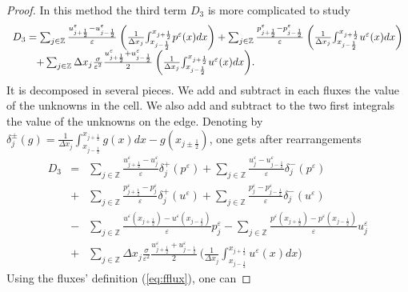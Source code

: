 \documentclass[a4paper,french,english,10pt]{article}
\newcommand\eps{\varepsilon}
\begin{document}
\begin{proof}
In this method the third term
 $D_3$ is more complicated to study
\begin{equation*}
\begin{array}{l}
 D_3 = \sum_{j\in \mathbb{Z}}
\frac{u_{j+\frac12 }^{\eps}-u_{j-\frac12 }^{\eps}}{\eps} \: \bigg(
\frac{1}{\Delta x_j} {\int_{x_{j-\frac12}}^{x_{j+\frac12}}}
 p^{\eps}(x) dx \bigg)
+\sum_{j\in \mathbb{Z}}
\frac{p_{j+\frac12 }^{\eps}-p_{j-\frac12 }^{\eps}}{\eps} \: \bigg(
\frac{1}{\Delta x_j} 
{\int_{x_{j-\frac12}}^{x_{j+\frac12}}}
 u^{\eps}(x) dx \bigg) \\
\hspace{0.8cm}+\sum_{j\in \mathbb{Z}} \Delta x_j  \frac{\sigma}{\eps^2}
\frac{u_{j+\frac12 }^{\eps}+u_{j-\frac12 }^{\eps}}{2}\: \bigg(
\frac{1}{\Delta x_j} {\int_{x_{j-\frac12}}^{x_{j+\frac12}}}
 u^{\eps}(x) dx \bigg).
\end{array}
\end{equation*}
 It is  decomposed in several pieces.
We add and subtract in each fluxes  the value of the unknowns in the
cell. We also add and subtract to the two first  integrals the value of the
unknowns on the edge. Denoting by $\delta_{j }^\pm
\left( g \right) =\frac{1}{\Delta
x_j} {\int_{x_{j-\frac12}}^{x_{j+\frac12}}} g(x) dx -g(x_{j\pm\frac12 })$,
 one gets after rearrangements
\begin{equation*}
\begin{array}{lll}
 D_3 &=& \underset{j\in \mathbb{Z}}{\sum}
\frac{u_{j+\frac12 }^{\eps}-u_j^{\eps}}{\eps} \delta_{j}^+\left(p^{\eps}\right)+
\underset{j\in \mathbb{Z}}{\sum}
\frac{u^{\eps}_j-u_{j-\frac12 }^{\eps}}{\eps}\delta_{j}^-\left(p^{\eps}\right)
\\
& +& \underset{j\in \mathbb{Z}}{\sum}
\frac{p_{j+\frac12 }^{\eps}-p_{j}^{\eps}}{\eps} 
\delta_{j}^+\left(u^{\eps}\right)
+\underset{j\in \mathbb{Z}}{\sum}
\frac{p^{\eps}_j-p_{j-\frac12 }^{\eps}}{\eps} 
\delta_{j}^-\left(u^{\eps}\right) \\
&-&\underset{j\in \mathbb{Z}}{\sum} 
\frac{u^{\eps}(x_{j+\frac12 })-u^{\eps}(x_{j-\frac12 })}{\eps} 
p^{\eps}_j
-
\underset{j\in \mathbb{Z}}{\sum} 
\frac{p^{\eps}(x_{j+\frac12 })-p^{\eps}(x_{j-\frac12 })}{\eps}
u^{\eps}_j  \\
&+& \underset{j\in \mathbb{Z}}{\sum} \Delta x_j  \frac{\sigma}{\eps^2}
\frac{u_{j+\frac12 }^{\eps}+u_{j-\frac12 }^{\eps}}{2}\: \bigg(
\frac{1}{\Delta x_j} {\int_{x_{j-\frac12}}^{x_{j+\frac12}}}u^{\eps}(x) dx \bigg)
\end{array}
\end{equation*}
Using the fluxes' definition (\ref{eq:fflux}), one can 

\end{proof}
\end{document}
